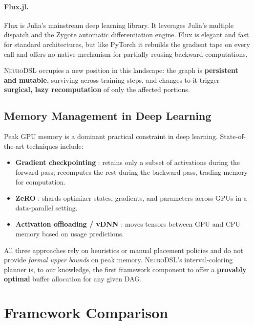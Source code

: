\documentclass{article}
\begin{document}
\paragraph{Flux.jl.}
Flux \cite{flux} is Julia's mainstream deep learning library. It leverages Julia's multiple dispatch and the Zygote \cite{zygote} automatic differentiation engine. Flux is elegant and fast for standard architectures, but like PyTorch it rebuilds the gradient tape on every call and offers no native mechanism for partially reusing backward computations.

\textsc{NeuroDSL} occupies a new position in this landscape: the graph is \textbf{persistent and mutable}, surviving across training steps, and changes to it trigger \textbf{surgical, lazy recomputation} of only the affected portions.

\subsection{Memory Management in Deep Learning}
Peak GPU memory is a dominant practical constraint in deep learning. State-of-the-art techniques include:

\begin{itemize}
  \item \textbf{Gradient checkpointing} \cite{checkpointing}: retains only a subset of activations during the forward pass; recomputes the rest during the backward pass, trading memory for computation.
  \item \textbf{ZeRO} \cite{zero}: shards optimizer states, gradients, and parameters across GPUs in a data-parallel setting.
  \item \textbf{Activation offloading / vDNN} \cite{vdnn}: moves tensors between GPU and CPU memory based on usage predictions.
\end{itemize}

All three approaches rely on heuristics or manual placement policies and do not provide \emph{formal upper bounds} on peak memory. \textsc{NeuroDSL}'s interval-coloring planner is, to our knowledge, the first framework component to offer a \textbf{provably optimal} buffer allocation for any given DAG.

\section{Framework Comparison}
\label{sec:comparison}
\end{document}
